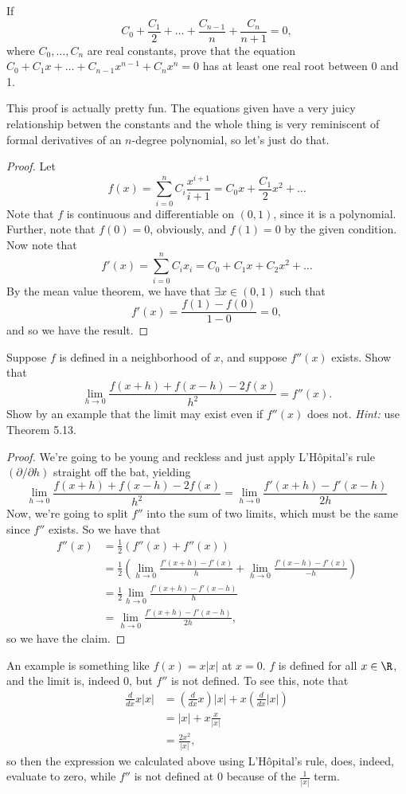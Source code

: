 \documentclass{assignment}
\newcommand{\die}{\partial}
\newcommand{\lhopital}{L'H\^opital}
\begin{document}
\begin{question}[5.4]
 If $$C_0 + \frac{C_1}{2} + \dots + \frac{C_{n-1}}{n} + \frac{C_n}{n + 1} = 0,$$ where $C_0, \ldots,
C_n$ are real constants, prove that the equation $C_0 + C_1x + \dots + C_{n-1}x^{n-1} + C_nx^n = 0$
has at least one real root between 0 and 1.
\end{question}
  This proof is actually pretty fun. The equations given have a very juicy relationship betwen the
constants and the whole thing is very reminiscent of formal derivatives of an $n$-degree polynomial,
so let's just do that. 
\begin{proof}
  Let $$f(x) = \sum_{i=0}^n C_i \frac{x^{i+1}}{i+1} = C_0x + \frac{C_1}{2}x^2 + \dots$$ Note that
$f$ is continuous and differentiable on $(0,1)$, since it is a polynomial. Further, note that $f(0)
= 0$, obviously, and $f(1) = 0$ by the given condition. Now note that $$f'(x) = \sum_{i=0}^n C_i x_i
= C_0 + C_1x + C_2x^2 + \dots$$ By the mean value theorem, we have that $\exists x\in (0,1)$ such
that $$f'(x) = \frac{f(1) - f(0)}{1 - 0} = 0,$$ and so we have the result.
\end{proof}

\begin{question}[5.11]
  Suppose $f$ is defined in a neighborhood of $x$, and suppose $f''(x)$ exists. Show that 
$$\lim_{h\to 0} \frac{f(x+h) + f(x - h) - 2f(x)}{h^2} = f''(x).$$ Show by an example that the limit
may exist even if $f''(x)$ does not. \emph{Hint:} use Theorem 5.13.
\end{question}
\begin{proof}
 We're going to be young and reckless and just apply \lhopital's rule $(\die/\die h)$ straight off the bat, yielding 
$$\lim_{h\to 0} \frac{f(x + h) + f(x - h) - 2f(x)}{h^2} = \lim_{h\to 0} \frac{f'(x+h) -
f'(x-h)}{2h}$$
Now, we're going to split $f''$ into the sum of two limits, which must be the same since $f''$
exists. So we have that
\begin{align*}
 f''(x) &= \frac{1}{2}(f''(x) + f''(x)) \\
&= \frac{1}{2}\left( \lim_{h\to 0} \frac{f'(x + h) - f'(x)}{h} + \lim_{h\to 0} \frac{f'(x - h) -
f'(x)}{-h} \right) \\
&= \frac{1}{2}\lim_{h\to 0} \frac{f'(x + h) - f'(x - h)}{h} \\
&= \lim_{h\to 0} \frac{f'(x + h) - f'(x - h)}{2h},
\end{align*}
so we have the claim.
\end{proof}
An example is something like $f(x) = x|x|$ at $x = 0$. $f$ is defined for all $x\in\R$, and the
limit is, indeed 0, but $f''$ is not defined. To see this, note that 
\begin{align*}
  \frac{d}{dx}x|x| &= \left( \frac{d}{dx}x \right)|x| + x \left( \frac{d}{dx}|x| \right) \\
                   &= |x| + x \frac{x}{|x|} \\
                   &= \frac{2x^2}{|x|},
\end{align*}
so then the expression we calculated above using \lhopital's rule, does, indeed, evaluate to zero,
while $f''$ is not defined at $0$ because of the $\frac{1}{|x|}$ term.
\end{document}
